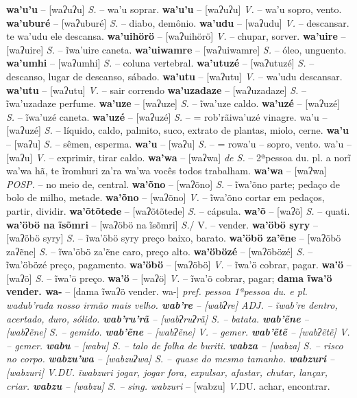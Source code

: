 {{{\textbf{wa'u'u} -- [waʔuʔu] \textit{S.} -- wa'u soprar.
\textbf{wa'u'u} -- [waʔuʔu] \textit{V.} -- wa'u sopro, vento.
\textbf{wa'uburé} -- [waʔuburé] \textit{S.} -- diabo, demônio.
\textbf{wa'udu} -- [waʔudu] \textit{V.} -- descansar. te wa'udu ele descansa.
\textbf{wa'uihörö} -- [waʔuihörö] \textit{V.} -- chupar, sorver.
\textbf{wa'uire} -- [waʔuire] \textit{S.} -- ĩwa'uire caneta.
\textbf{wa'uiwamre} -- [waʔuiwamre] \textit{S.} -- óleo, unguento.
\textbf{wa'umhi} -- [waʔumhi] \textit{S.} -- coluna vertebral.
\textbf{wa'utuzé} -- [waʔutuzé] \textit{S.} -- descanso, lugar de descanso, sábado.
\textbf{wa'utu} -- [waʔutu] \textit{V.} -- wa'udu descansar.
\textbf{wa'utu} -- [waʔutu] \textit{V.} -- {sair correndo}
\textbf{wa'uzadaze} -- [waʔuzadaze] \textit{S.} -- ĩwa'uzadaze perfume.
\textbf{wa'uze} -- [waʔuze] \textit{S.} -- ĩwa'uze caldo.
\textbf{wa'uzé} -- [waʔuzé] \textit{S.} -- ĩwa'uzé caneta.
\textbf{wa'uzé} -- [waʔuzé] \textit{S.} -- = rob'rãiwa'uzé vinagre. wa'u} -- [waʔuzé] \textit{S.} -- líquido, caldo, palmito, suco, extrato de plantas, miolo, cerne.
\textbf{wa'u} -- [waʔu] \textit{S.} -- sêmen, esperma.
\textbf{wa'u} -- [waʔu] \textit{S.} -- = rowa'u -- sopro, vento. wa'u} -- [waʔu] \textit{V.} -- exprimir, tirar caldo.
\textbf{wa'wa} -- [waʔwa] \textit{de S.} -- 2ªpessoa du. pl. a norĩ wa'wa hã, te ĩromhuri za'ra wa'wa vocês todos trabalham.
\textbf{wa'wa} -- [waʔwa] \textit{POSP.} -- no meio de, central.
\textbf{wa'õno} -- [waʔõno] \textit{S.} -- ĩwa'õno parte; pedaço de bolo de milho, metade.
\textbf{wa'õno} -- [waʔõno] \textit{V.} -- ĩwa'õno cortar em pedaços, partir, dividir.
\textbf{wa'õtõtede} -- [waʔõtõtede] \textit{S.} -- cápsula.
\textbf{wa'õ} -- [waʔõ] \textit{S.} -- quati.
\textbf{wa'öbö na ĩsõmri} -- [waʔöbö na ĩsõmri] \textit{S.}/ V.} -- vender.
\textbf{wa'öbö syry} -- [waʔöbö syry] \textit{S.} -- ĩwa'öbö syry preço baixo, barato.
\textbf{wa'öbö za'ẽne} -- [waʔöbö zaʔẽne] \textit{S.} -- ĩwa'öbö za'ẽne caro, preço alto.
\textbf{wa'öbözé} -- [waʔöbözé] \textit{S.} -- ĩwa'öbözé preço, pagamento.
\textbf{wa'öbö} -- [waʔöbö] \textit{V.} -- ĩwa'ö cobrar, pagar.
\textbf{wa'ö} -- [waʔö] \textit{S.} -- ĩwa'ö preço.
\textbf{wa'ö} -- [waʔö] \textit{V.} -- ĩwa'ö cobrar, pagar;
\textbf{dama ĩwa'ö vender. wa-} -- [dama ĩwaʔö vender. wa-] \textit{pref. pessoa 1ªpessoa du. e pl. wadub'rada nosso irmão mais velho.
\textbf{wab're} -- [wabʔre] \textit{ADJ.} -- ĩwab're dentro, acertado, duro, sólido.
\textbf{wab'ru'rã} -- [wabʔruʔrã] \textit{S.} -- batata.
\textbf{wab'ẽne} -- [wabʔẽne] \textit{S.} -- gemido.
\textbf{wab'ẽne} -- [wabʔẽne] \textit{V.} -- gemer.
\textbf{wab'ẽtẽ} -- [wabʔẽtẽ] \textit{V.} -- gemer.
\textbf{wabu} -- [wabu] \textit{S.} -- talo de folha de buriti.
\textbf{wabza} -- [wabza] \textit{S.} -- risco no corpo.
\textbf{wabzu'wa} -- [wabzuʔwa] \textit{S.} -- quase do mesmo tamanho.
\textbf{wabzuri} -- [wabzuri] \textit{V.}DU. ĩwabzuri jogar, jogar fora, expulsar, afastar, chutar, lançar, criar.
\textbf{wabzu} -- [wabzu] \textit{S.} -- sing. wabzuri} -- [wabzu] \textit{V.}DU. achar, encontrar.
